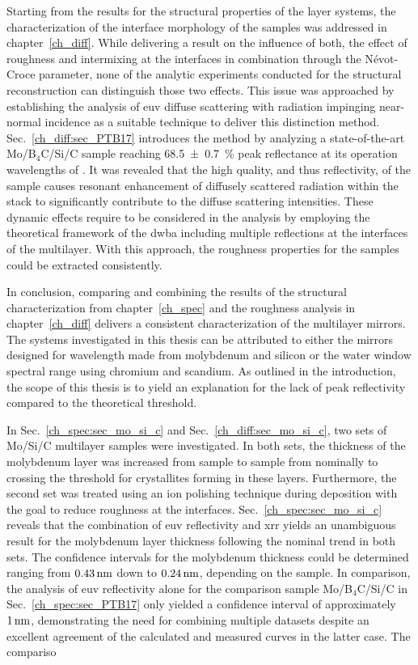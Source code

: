 Starting from the results for the structural properties of the layer systems, the characterization of the interface morphology of the samples was addressed in chapter~\ref{ch_diff}. While delivering a result on the influence of both, the effect of roughness and intermixing at the interfaces in combination through the N{\'e}vot-Croce parameter, none of the analytic experiments conducted for the structural reconstruction can distinguish those two effects. This issue was approached by establishing the analysis of \gls{euv} diffuse scattering with radiation impinging near-normal incidence as a suitable technique to deliver this distinction method. Sec.~\ref{ch_diff:sec_PTB17} introduces the method by analyzing a state-of-the-art Mo/B$_4$C/Si/C sample reaching \SI{68.5 \pm 0.7}{\percent} peak reflectance at its operation wavelengths of . It was revealed that the high quality, and thus reflectivity, of the sample causes resonant enhancement of diffusely scattered radiation within the stack to significantly contribute to the diffuse scattering intensities. These dynamic effects require to be considered in the analysis by employing the theoretical framework of the \glsdesc{dwba} including multiple reflections at the interfaces of the multilayer. With this approach, the roughness properties for the samples could be extracted consistently.

In conclusion, comparing and combining the results of the structural characterization from chapter~\ref{ch_spec} and the roughness analysis in chapter~\ref{ch_diff} delivers a consistent characterization of the multilayer mirrors. The systems investigated in this thesis can be attributed to either the mirrors designed for  wavelength made from molybdenum and silicon or the water window spectral range using chromium and scandium. As outlined in the introduction, the scope of this thesis is to yield an explanation for the lack of peak reflectivity compared to the theoretical threshold.

In Sec.~\ref{ch_spec:sec_mo_si_c} and Sec.~\ref{ch_diff:sec_mo_si_c}, two sets of Mo/Si/C multilayer samples were investigated. In both sets, the thickness of the molybdenum layer was increased from sample to sample from nominally  to  crossing the threshold for crystallites forming in these layers. Furthermore, the second set was treated using an ion polishing technique during deposition with the goal to reduce roughness at the interfaces. Sec.~\ref{ch_spec:sec_mo_si_c} reveals that the combination of \gls{euv} reflectivity and \glsdesc{xrr} yields an unambiguous result for the molybdenum layer thickness following the nominal trend in both sets. The confidence intervals for the molybdenum thickness could be determined ranging from $\nm{0.43}$ down to $\nm{0.24}$, depending on the sample. In comparison, the analysis of \gls{euv} reflectivity alone for the comparison sample Mo/B$_4$C/Si/C in Sec.~\ref{ch_spec:sec_PTB17} only yielded a confidence interval of approximately $\nm{1}$, demonstrating the need for combining multiple datasets despite an excellent agreement of the calculated and measured curves in the latter case. The compariso


